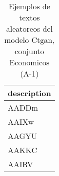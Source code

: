 \begin{table}[H]
\centering
\fontsize{8}{14}\selectfont
\caption{Ejemplos de textos aleatoreos del modelo Ctgan, conjunto Economicos (A-1)}
\label{table-sample10-economicos-a-1-ctgan-text}
\begin{tabular}{|m{50em}|}
\hline
\rowcolor[gray]{0.8}
description \\
\hline AADDm \\
\hline AAIXw \\
\hline AAGYU \\
\hline AAKKC \\
\hline AAIRV \\
\hline
\end{tabular}
\end{table}
